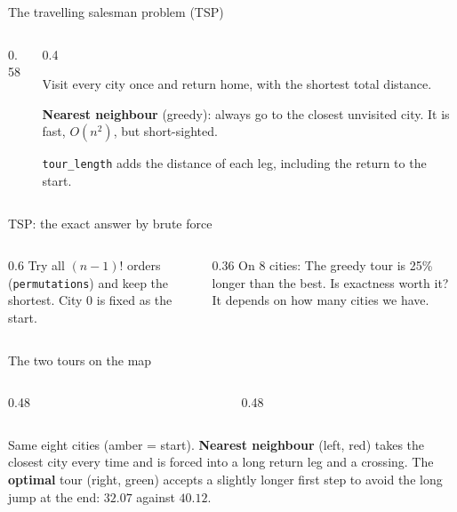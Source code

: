 \documentclass[aspectratio=169,10pt]{beamer}
\newcommand{\figtab}[2][0.5]{\begin{sfig}[#1]\end{sfig}}
\begin{document}
\begin{frame}{The travelling salesman problem (TSP)}
\begin{columns}[T]
\begin{column}{0.58\textwidth}
\end{column}
\begin{column}{0.4\textwidth}
{\small
Visit every city once and return home, with the shortest total distance.

\vspace{2mm}
\textbf{Nearest neighbour} (greedy): always go to the closest unvisited city. It is fast, $O(n^2)$, but short-sighted.

\vspace{2mm}
\texttt{tour\_length} adds the distance of each leg, including the return to the start.}
\end{column}
\end{columns}
\end{frame}

\begin{frame}{TSP: the exact answer by brute force}
\begin{columns}[T]
\begin{column}{0.6\textwidth}
\pycode[\fontsize{7.6}{9}\selectfont]{tsp_brute}
\vspace{2mm}
{\small
Try all $(n-1)!$ orders (\texttt{permutations}) and keep the shortest. City 0 is fixed as the start.}
\end{column}
\begin{column}{0.36\textwidth}
{\small On 8 cities:}
{\small
\vspace{2mm}
The greedy tour is 25\% longer than the best. Is exactness worth it? It depends on how many cities we have.}
\end{column}
\end{columns}
\end{frame}

\begin{frame}{The two tours on the map}
\begin{columns}[T]
\begin{column}{0.48\textwidth}
\figtab[0.62]{fig_tsp_nn}
\end{column}
\begin{column}{0.48\textwidth}
\figtab[0.62]{fig_tsp_opt}
\end{column}
\end{columns}
\vspace{1mm}
{\small Same eight cities (amber = start). \textbf{Nearest neighbour} (left, red) takes the closest city every time and is forced into a long return leg and a crossing. The \textbf{optimal} tour (right, green) accepts a slightly longer first step to avoid the long jump at the end: $32.07$ against $40.12$.}
\end{frame}
\end{document}
